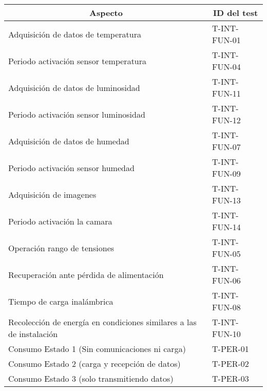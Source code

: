 \begin{table}[H]
\centering
\begin{tabular}{|l|l|}
\hline
\multicolumn{1}{|c|}{\textbf{Aspecto}}                               & \multicolumn{1}{c|}{\textbf{ID del test}} \\ \hline
Adquisición de datos de temperatura                                  & T-INT-FUN-01                              \\ \hline
Periodo activación sensor temperatura                                & T-INT-FUN-04                              \\ \hline
Adquisición de datos de luminosidad                                  & T-INT-FUN-11                              \\ \hline
Periodo activación sensor luminosidad                                & T-INT-FUN-12                              \\ \hline
Adquisición de datos de humedad                                      & T-INT-FUN-07                              \\ \hline
Periodo activación sensor humedad                                    & T-INT-FUN-09                              \\ \hline
Adquisición de imagenes		                                         & T-INT-FUN-13                              \\ \hline
Periodo activación la camara                                       	 & T-INT-FUN-14                              \\ \hline
Operación rango de tensiones                                         & T-INT-FUN-05                              \\ \hline
Recuperación ante pérdida de alimentación                            & T-INT-FUN-06                              \\ \hline
Tiempo de carga inalámbrica                                          & T-INT-FUN-08                              \\ \hline
Recolección de energía en condiciones similares a las de instalación & T-INT-FUN-10                              \\ \hline
Consumo Estado 1 (Sin comunicaciones ni carga)                       & T-PER-01                                  \\ \hline
Consumo Estado 2 (carga y recepción de datos)                        & T-PER-02                                  \\ \hline
Consumo Estado 3 (solo transmitiendo datos)                          & T-PER-03                                  \\ \hline

\end{tabular}
\end{table}
